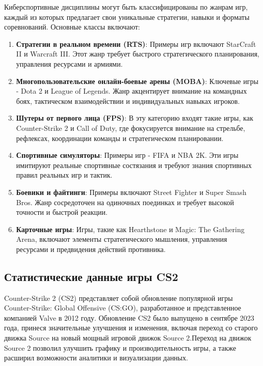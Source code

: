 Киберспортивные дисциплины могут быть классифицированы по жанрам игр, каждый из которых предлагает свои уникальные стратегии, навыки и форматы соревнований. Основные классы включают:

\begin{enumerate}
	\item \textbf{Стратегии в реальном времени (RTS)}: 
	Примеры игр включают StarCraft II и Warcraft III. Этот жанр требует быстрого стратегического планирования, управления ресурсами и армиями.
	
	\item \textbf{Многопользовательские онлайн-боевые арены (MOBA)}: 
	Ключевые игры - Dota 2 и League of Legends. Жанр акцентирует внимание на командных боях, тактическом взаимодействии и индивидуальных навыках игроков.
	
	\item \textbf{Шутеры от первого лица (FPS)}: 
	В эту категорию входят такие игры, как Counter-Strike 2 и Call of Duty, где фокусируется внимание на стрельбе, рефлексах, координации команды и стратегическом планировании.
	
	\item \textbf{Спортивные симуляторы}: 
	Примеры игр - FIFA и NBA 2K. Эти игры имитируют реальные спортивные состязания и требуют знания спортивных правил реальных игр и тактик.
	
	\item \textbf{Боевики и файтинги}: 
	Примеры включают Street Fighter и Super Smash Bros. Жанр сосредоточен на одиночных поединках и требует высокой точности и быстрой реакции.
	
	\item \textbf{Карточные игры}: 
	Игры, такие как Hearthstone и Magic: The Gathering Arena, включают элементы стратегического мышления, управления ресурсами и предвидения действий противника.
\end{enumerate}
\subsection{Статистические данные игры CS2}

Counter-Strike 2 (CS2) представляет собой обновление популярной игры Counter-Strike: Global Offensive (CS:GO), разработанное и представленное компанией Valve в 2012 году. Обновление CS2 было выпущено в сентябре 2023 года, принеся значительные улучшения и изменения, включая переход со старого движка Source на новый мощный игровой движок Source 2.Переход на движок Source 2 позволил улучшить графику и производительность игры, а также расширил возможности аналитики и визуализации данных.

